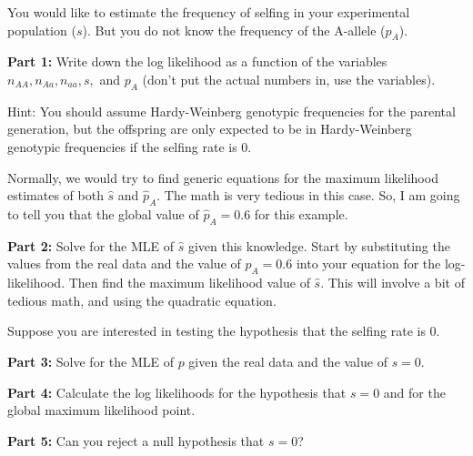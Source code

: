 \documentclass[11pt]{article}
\begin{document}
You would like to estimate the frequency of selfing in your experimental population ($s$).  But you do not know the frequency of the A-allele ($p_A$).

\begin{compactenum}
	\item[{\bf Part 1:}] Write down the log likelihood as a function of the variables $n_{AA}, n_{Aa}, n_{aa}, s,$ and $p_A$ (don't put the actual numbers in, use the variables).
\end{compactenum}

Hint: You should assume Hardy-Weinberg genotypic frequencies for the parental generation, but the offspring are only expected to be in Hardy-Weinberg genotypic frequencies if the selfing rate is 0.



Normally, we would try to find generic equations for the maximum likelihood estimates of both $\hat s$ and $\hat p_A$.
The math is very tedious in this case.  So, I am going to tell you that the global value of $\hat p_A = 0.6$ for this example. 
\begin{compactenum}
	\item[{\bf Part 2:}] Solve for the MLE of $\hat s$ given this knowledge.  Start  by substituting the values from the real data and the value of $\hat p_A=0.6$ into your equation for the log-likelihood. Then find the maximum likelihood value of $\hat s$.  This will involve a bit of tedious math, and using the quadratic equation.
\end{compactenum}

Suppose you are interested in testing the hypothesis that the selfing rate is 0.
\begin{compactenum}
	\item[{\bf Part 3:}] Solve for the MLE of $p$ given the real data and the value of $s = 0$.
	\item[{\bf Part 4:}] Calculate the log likelihoods for the hypothesis that $s=0$ and  for the global maximum likelihood point.
	\item[{\bf Part 5:}] Can you reject a null hypothesis that $s=0$?
\end{compactenum}
\end{document}
